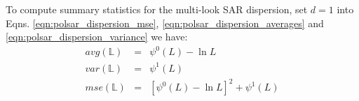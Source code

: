 \documentclass[journal]{IEEEtran}
\begin{document}
%

To compute summary statistics for the multi-look SAR dispersion,
  set $d=1$ into Eqns. \ref{eqn:polsar_dispersion_mse}, \ref{eqn:polsar_dispersion_averages} and \ref{eqn:polsar_dispersion_variance}
we have:
  \begin{eqnarray*}
    avg(\mathbb{L}) &=& \psi^0(L) - \ln{L} \\
    var(\mathbb{L}) &=& \psi^1(L) \\
    mse(\mathbb{L}) &=& \left[ \psi^0(L) - \ln{L} \right]^2 + \psi^1(L)
\end{eqnarray*}
\end{document}
